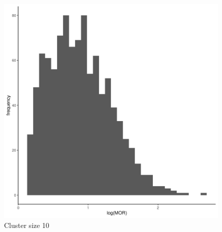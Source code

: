 \documentclass[
  letterpaper,
  DIV=11,
  numbers=noendperiod,
  titlepage]{scrartcl}
\begin{document}
\begin{figure}
\begin{minipage}[t]{0.24\linewidth}
{{\includegraphics{../../plots/two-lvl-ran-slope/low-prev/hist_50_10_two_lvl_slp_low_prev_q2.png}

}

\caption{Cluster size 10}

}

\end{minipage}%
%
\begin{minipage}[t]{0.24\linewidth}

{\centering 

}
\end{minipage}
\end{figure}
\end{document}
